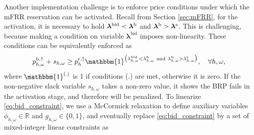 Another implementation challenge is to enforce price conditions under which the mFRR reservation can be activated.
Recall from Section \ref{sec:mFRR}, for the activation, it is necessary to hold $ \bm{\lambda}^{\text{bid}} <  \bm{\lambda}^{\rm{b}}$ and $ \bm{\lambda}^{\rm{b}} > \bm{\lambda}^{\rm{s}}$. This is challenging, because making a condition on variable $ \bm{\lambda}^{\text{bid}}$ imposes non-linearity. These conditions can be equivalently enforced as
%
%
\begin{equation}\label{eq:bid_constraint}
    p^{\rm{b}, \uparrow}_{h,\omega} + s_{h,\omega} \geq p^{\rm{r},\uparrow}_{h}  \mathbbm{1}^{\big(\lambda^{\text{bid}}_{h,\omega} < \lambda^{\rm{b}}_{h,\omega} \ \text{and} \ \lambda^{\rm{b}}_{h,\omega} > \lambda^{\rm{s}}_{h,\omega}\big)}, \quad \forall{h,\omega},
\end{equation}
where $\mathbbm{1}^{(.)}$ is 1 if conditions (.) are met, otherwise it is zero. If the non-negative slack variable $s_{h,\omega}$ takes a non-zero value, it shows the BRP fails in the activation stage, and therefore will be penalized. To linearize \eqref{eq:bid_constraint}, we use a McCormick relaxation \cite{mccormick1976computability} to define auxiliary  variables $\phi_{h,\omega} \in \mathbb{R}$ and $g_{h,\omega} \in \{0, 1\}$, and eventually replace \eqref{eq:bid_constraint} by a set of mixed-integer linear constraints as
%
%

